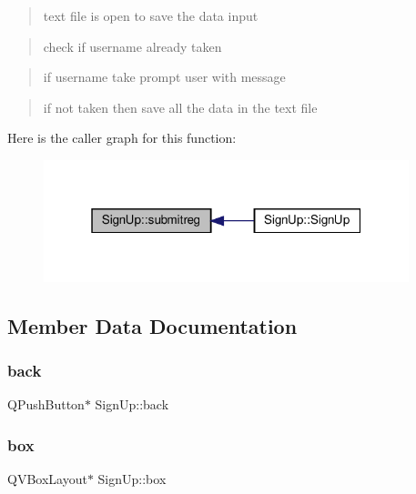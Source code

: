 \begin{quote}
text file is open to save the data input \end{quote}


\begin{quote}
check if username already taken \end{quote}


\begin{quote}
if username take prompt user with message \end{quote}


\begin{quote}
if not taken then save all the data in the text file \end{quote}
Here is the caller graph for this function\+:
\nopagebreak
\begin{figure}[H]
\begin{center}
\leavevmode
\includegraphics[width=301pt]{classSignUp_aad0f6a54d93f8354e13db101189e2319_icgraph}
\end{center}
\end{figure}


\subsection{Member Data Documentation}
\mbox{\label{classSignUp_a3118da992e3ddddad55aefb058d3f181}} 
\subsubsection{\texorpdfstring{back}{back}}
{\footnotesize\ttfamily Q\+Push\+Button$\ast$ Sign\+Up\+::back}

\mbox{\label{classSignUp_ab2c944409ffb7239cc660d27cb5427fb}} 
\subsubsection{\texorpdfstring{box}{box}}
{\footnotesize\ttfamily Q\+V\+Box\+Layout$\ast$ Sign\+Up\+::box}

